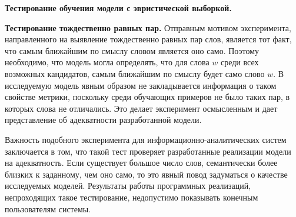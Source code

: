 
%
%

\textbf{Тестирование обучения модели с эвристической выборкой.}

\textbf{Тестирование тождественно равных пар.} \label{sec:test_equal}
Отправным мотивом эксперимента, направленного на выявление тождественно равных пар слов, является тот факт, что самым ближайшим по смыслу словом является оно само. Поэтому необходимо, что модель могла определять, что для слова $w$ среди всех возможных кандидатов, самым ближайшим по смыслу будет само слово $w$. В исследуемую модель явным образом не закладывается информация о таком свойстве метрики, поскольку среди обучающих примеров не было таких пар, в которых слова не отличались. Это делает эксперимент осмысленным и дает представление об адекватности разработанной модели.

Важность подобного эксперимента для информационно-аналитических систем заключается в том, что такой тест проверяет разработанные реализации модели на адекватность. Если существует большое число слов, семантически более близких к заданному, чем оно само, то это явный повод задуматься о качестве исследуемых моделей. Результаты работы программных реализаций, непроходящих такое тестирование, недопустимо показывать конечным пользователям системы.

